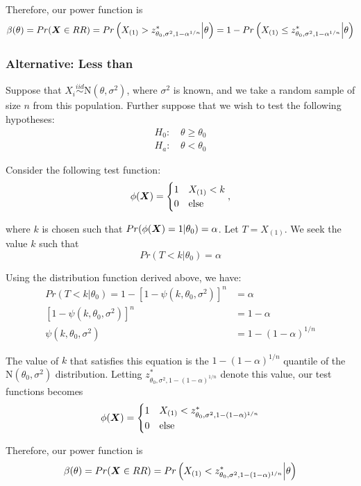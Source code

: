 \documentclass[]{article}
\newcommand{\bfX}{\mbox{\boldmath $X$}}
\begin{document}
Therefore, our power function is
\[
\beta(\theta) = Pr(\bfX \in RR) = Pr\left(X_{(1)} > z^*_{\theta_0, \sigma^2, 1-\alpha^{1/n}}\Big| \theta\right) = 1 - Pr\left(X_{(1)}\leq z^*_{\theta_0, \sigma^2, 1-\alpha^{1/n}} \Big| \theta\right)
\]

\subsubsection{Alternative: Less than}

Suppose that $X_i \stackrel{iid}{\sim} \text{N}(\theta, \sigma^2)$, where $\sigma^2$ is known, and we take a random sample of size $n$ from this population. Further suppose that we wish to test the following hypotheses:
\[
\begin{split}
\text{$H_0$: }& \theta \geq \theta_0 \\
\text{$H_a$: }& \theta < \theta_0
\end{split}
\]

Consider the following test function:
\[
\phi(\bfX) = \begin{cases}
1 & X_{(1)} < k \\
0 & \text{else}
\end{cases},
\]

where $k$ is chosen such that $Pr(\phi(\bfX) = 1|\theta_0) = \alpha$. Let $T = X_{(1)}$. We seek the value $k$ such that 
\[
Pr(T < k | \theta_0) = \alpha
\]

Using the distribution function derived above, we have:
\[
\begin{split}
Pr(T < k | \theta_0) = 1 - [1 - \psi(k, \theta_0, \sigma^2)]^n &= \alpha \\
[1 - \psi(k, \theta_0, \sigma^2)]^n &= 1- \alpha \\
\psi(k, \theta_0, \sigma^2) &= 1 - (1 - \alpha)^{1/n}
\end{split}
\]

The value of $k$ that satisfies this equation is the $1 - (1 - \alpha)^{1/n}$ quantile of the $\text{N}(\theta_0, \sigma^2)$ distribution. Letting $z^*_{\theta_0, \sigma^2, 1 - (1-\alpha)^{1/n}}$ denote this value, our test functions becomes
\[
\phi(\bfX) = \begin{cases}
1 & X_{(1)} < z^*_{\theta_0, \sigma^2, 1 - (1-\alpha)^{1/n}} \\
0 & \text{else}
\end{cases}
\]

Therefore, our power function is
\[
\beta(\theta) = Pr(\bfX \in RR) = Pr\left(X_{(1)} < z^*_{\theta_0, \sigma^2, 1 - (1-\alpha)^{1/n}}\Big| \theta\right)
\]
\end{document}
